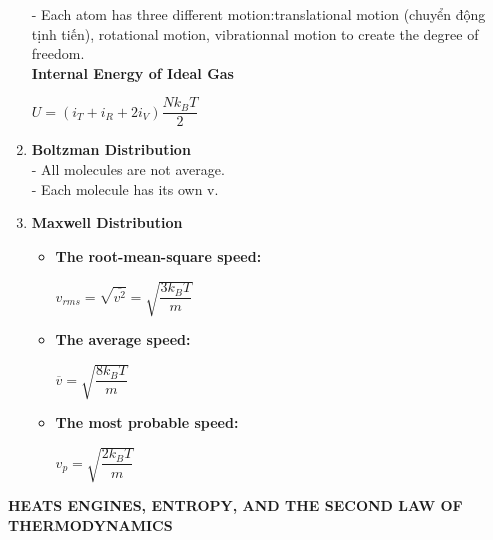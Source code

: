 \documentclass[10pt]{article}
\begin{document}
\begin{enumerate}
	- Each atom has three different motion:translational motion (chuyển động tịnh tiến), rotational motion, vibrationnal motion to create the degree of freedom.\\
	\textbf{Internal Energy of Ideal Gas}
	\begin{mybox}
	\begin{center}
	$U = (i_T + i_R + 2i_V) \dfrac{Nk_BT}{2}$
	\end{center}
	\end{mybox}
	\item \textbf{Boltzman Distribution}\\
	- All molecules are not average.\\
	- Each molecule has its own v.
	\item \textbf{Maxwell Distribution}\\
	\begin{itemize}
		\item  \textbf{The root-mean-square speed:}
		\begin{mybox}
		\begin{center}
		$v_{rms} = \sqrt{\overline{v^2}} = \sqrt{\dfrac{3k_BT}{m}}$
		\end{center}
		\end{mybox}
		\item \textbf{The average speed:}
		\begin{mybox}
		\begin{center}
		$\overline{v} = \sqrt{\dfrac{8k_BT}{m}}$
		\end{center}
		\end{mybox}
		\item \textbf{The most probable speed:}
		\begin{mybox}
		\begin{center}
		$v_{p}= \sqrt{\dfrac{2k_BT}{m}}$
		\end{center}
		\end{mybox}
	\end{itemize}		
\end{enumerate}
\pagebreak
\begin{center}
\textbf{HEATS ENGINES, ENTROPY, AND THE SECOND LAW OF THERMODYNAMICS}
\end{center}
\end{document}
